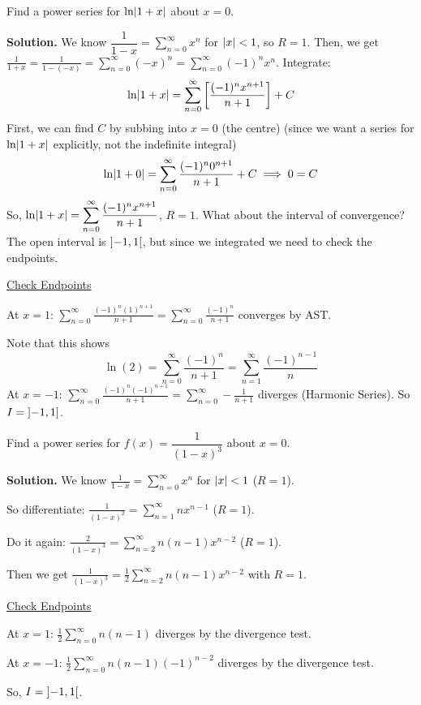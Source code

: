 \begin{Example}{}{}
    Find a power series for $ \ln\lvert1+x\rvert $ about $ x=0 $.

    \textbf{Solution.} We know $ \dfrac{1}{1-x}=\sum\limits_{n=0}^{\infty} x^n $
    for $ \lvert x\rvert<1 $, so $ R=1 $. Then, we get
    $ \displaystyle \frac{1}{1+x} =\frac{1}{1-(-x)}=
        \sum\limits_{n=0}^{\infty} (-x)^n=\sum\limits_{n=0}^{\infty}
        (-1)^n x^n $. Integrate:
    \[ \ln\lvert1+x\rvert=\sum\limits_{n=0}^{\infty} \left[ \frac{(-1)^n x^{n+1}}{n+1} \right]
        +C \]
    First, we can find $ C $ by subbing into $ x= 0 $ (the centre)
    (since we want a series for $ \ln\lvert1+x\rvert $ explicitly, not the indefinite
    integral)
    \[ \ln\lvert1+0\rvert=\sum\limits_{n=0}^{\infty} \frac{(-1)^n 0^{n+1}}{n+1} +C\implies 0=C \]
    So, $ \displaystyle \ln\lvert1+x\rvert=\sum\limits_{n=0}^{\infty} \frac{(-1)^n x^{n+1}}{n+1}  $,
    $ R=1 $. What about the interval of convergence? The open interval is $ \interval[open]{-1}{1} $,
    but since we integrated we need to check the endpoints.

    \underline{Check Endpoints}

    At $ x=1 $: $ \displaystyle \sum\limits_{n=0}^{\infty} \frac{(-1)^n (1)^{n+1}}{n+1}
        =\sum\limits_{n=0}^{\infty} \frac{(-1)^n}{n+1} $ converges by AST\@.

    Note that this shows
    \[ \boxed{\ln(2)=\sum\limits_{n=0}^{\infty}\frac{(-1)^n}{n+1}=\sum\limits_{n=1}^{\infty}
            \frac{(-1)^{n-1}}{n}} \]
    At $ x=-1 $: $ \displaystyle \sum\limits_{n=0}^{\infty}
        \frac{(-1)^n(-1)^{n+1}}{n+1} =\sum\limits_{n=0}^{\infty} -\frac{1}{n+1}   $
    diverges (Harmonic Series). So $ I=\interval[open left]{-1}{1} $.
\end{Example}

\begin{Example}{}{}
    Find a power series for $ f(x)=\dfrac{1}{(1-x)^3} $ about $ x=0 $.

    \textbf{Solution.} We know $ \displaystyle \frac{1}{1-x} =\sum\limits_{n=0}^{\infty} x^n $
    for $ \lvert x\rvert<1 $ ($ R=1 $).

    So differentiate: $ \displaystyle
        \frac{1}{(1-x)^2} =\sum\limits_{n=1}^{\infty} n x^{n-1} $ ($ R=1 $).

    Do it again: $ \displaystyle \frac{2}{(1-x)^3} =\sum\limits_{n=2}^{\infty} n(n-1)x^{n-2} $
    ($ R=1 $).

    Then we get $ \displaystyle\frac{1}{(1-x)^3}=\frac{1}{2}\sum\limits_{n=2}^{\infty} n(n-1)x^{n-2} $
    with $ R=1 $.

    \underline{Check Endpoints}

    At $ x=1 $: $ \displaystyle \frac{1}{2} \sum\limits_{n=0}^{\infty} n(n-1) $
    diverges by the divergence test.

    At $ x=-1 $: $ \displaystyle \frac{1}{2}\sum\limits_{n=0}^{\infty} n(n-1)(-1)^{n-2} $
    diverges by the divergence test.

    So, $ I=\interval[open]{-1}{1} $.
\end{Example}

